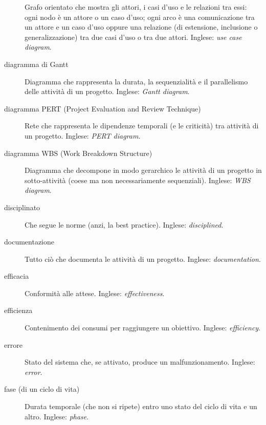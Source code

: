 \documentclass[a4paper]{article}
\begin{document}
\begin{description}
			Grafo orientato che mostra gli attori, i casi d'uso e le relazioni tra essi: ogni nodo è un attore o un caso d'uso; ogni arco è una comunicazione tra un attore e un caso d'uso oppure una relazione (di estensione, inclusione o generalizzazione) tra due casi d'uso o tra due attori. Inglese: \emph{use case diagram}.
			
	\item[diagramma di Gantt] 

			Diagramma che rappresenta la durata, la sequenzialità e il parallelismo delle attività di un progetto. Inglese: \emph{Gantt diagram}.
			
	\item[diagramma PERT (Project Evaluation and Review Technique)] 

			Rete che rappresenta le dipendenze temporali (e le criticità) tra attività di un progetto. Inglese: \emph{PERT diagram}.
			
	\item[diagramma WBS (Work Breakdown Structure)] 

			Diagramma che decompone in modo gerarchico le attività di un progetto in sotto-attività (coese ma non necessariamente sequenziali). Inglese: \emph{WBS diagram}.
			
	\item[disciplinato] 

			Che segue le norme (anzi, la best practice). Inglese: \emph{disciplined}.
			
	\item[documentazione] 

			Tutto ciò che documenta le attività di un progetto. Inglese: \emph{documentation}.
			
	\item[efficacia] 

			Conformità alle attese. Inglese: \emph{effectiveness}.
			
	\item[efficienza] 

			Contenimento dei consumi per raggiungere un obiettivo. Inglese: \emph{efficiency}.
			
	\item[errore] 

			Stato del sistema che, se attivato, produce un malfunzionamento. Inglese: \emph{error}.
			
	\item[fase (di un ciclo di vita)] 

			Durata temporale (che non si ripete) entro uno stato del ciclo di vita e un altro. Inglese: \emph{phase}.
			

\end{description}
\end{document}
